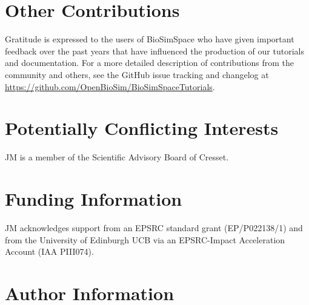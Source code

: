 \documentclass[9pt,tutorial]{livecoms}
\newcommand{\githubrepository}{\url{https://github.com/OpenBioSim/BioSimSpaceTutorials}}  %
\begin{document}
\section{Other Contributions}
%
Gratitude is expressed to the users of BioSimSpace who have given important feedback over the past years that have influenced the production of our tutorials and documentation. 
For a more detailed description of contributions from the community and others, see the GitHub issue tracking and changelog at \githubrepository.

\section{Potentially Conflicting Interests}
JM is a member of the Scientific Advisory Board of Cresset. 

\section{Funding Information}
JM acknowledges support from an EPSRC standard grant (EP/P022138/1) and from the University of Edinburgh UCB via an EPSRC-Impact Acceleration Account (IAA PIII074).

\section*{Author Information}
\makeorcid




\end{document}
